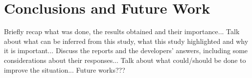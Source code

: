\chapter{Conclusions and Future Work}


Briefly recap what was done, the results obtained and their importance...
\newline \newline
Talk about what can be inferred from this study, what this study highlighted and why it is important...
\newline \newline
{}
Discuss the reports and the developers' answers, including some considerations about their responses...
\newline \newline
{}
Talk about what could/should be done to improve the situation...
\newline \newline
Future works???

